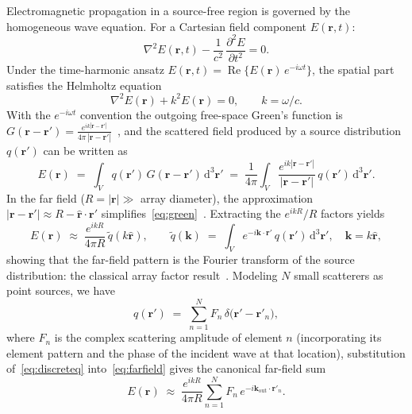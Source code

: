 \documentclass[11pt,letterpaper]{article}
\theoremstyle{definition}
\theoremstyle{plain}
\begin{document}
Electromagnetic propagation in a source-free region is governed by the homogeneous wave equation. For a Cartesian field component $E(\mathbf{r},t)$:
\[
\nabla^2 E(\mathbf{r},t) - \frac{1}{c^2}\,\frac{\partial^2 E}{\partial t^2} = 0.
\]
Under the time-harmonic ansatz $E(\mathbf{r},t) = \operatorname{Re}\{E(\mathbf{r})\,e^{-i\omega t}\}$, the spatial part satisfies the Helmholtz equation
\[
\nabla^2 E(\mathbf{r}) + k^2 E(\mathbf{r}) = 0, \qquad k = \omega/c.
\]
With the $e^{-i\omega t}$ convention the outgoing free-space Green's function is $G(\mathbf{r}-\mathbf{r}') = \frac{e^{ik|\mathbf{r}-\mathbf{r}'|}}{4\pi\,|\mathbf{r}-\mathbf{r}'|}$~\cite{Stratton1941,Jackson1999}, and the scattered field produced by a source distribution $q(\mathbf{r}')$ can be written as
\begin{equation}
E(\mathbf{r}) \;=\; \int_V q(\mathbf{r}')\,G(\mathbf{r}-\mathbf{r}')\,\mathrm{d}^3\mathbf{r}'
\;=\; \frac{1}{4\pi}\int_V \frac{e^{ik|\mathbf{r}-\mathbf{r}'|}}{|\mathbf{r}-\mathbf{r}'|}\,
q(\mathbf{r}')\,\mathrm{d}^3\mathbf{r}'.
\label{eq:green}
\end{equation}
In the far field ($R = |\mathbf{r}| \gg$ array diameter), the approximation $|\mathbf{r}-\mathbf{r}'| \approx R - \hat{\mathbf{r}}\cdot\mathbf{r}'$ simplifies~\eqref{eq:green}~\cite{Balanis2016,Mailloux2017_PhasedArrayBook}. Extracting the $e^{ikR}/R$ factors yields
\begin{equation}
E(\mathbf{r}) \;\approx\; \frac{e^{ikR}}{4\pi R}\,
\widetilde{q}\!\left(k\hat{\mathbf{r}}\right),
\qquad
\widetilde{q}(\mathbf{k}) \;=\; \int_V e^{-i\mathbf{k}\cdot\mathbf{r}'}\,q(\mathbf{r}')\,\mathrm{d}^3\mathbf{r}', \quad \mathbf{k} = k\hat{\mathbf{r}},
\label{eq:farfield}
\end{equation}
showing that the far-field pattern is the Fourier transform of the source distribution: the classical array factor result~\cite{Balanis2016,Mailloux2017_PhasedArrayBook}. Modeling $N$ small scatterers as point sources, we have
\begin{equation}
q(\mathbf{r}') \;=\; \sum_{n=1}^N F_n\,\delta\!\big(\mathbf{r}'-\mathbf{r}'_n\big),
\label{eq:discreteq}
\end{equation}
where $F_n$ is the complex scattering amplitude of element $n$ (incorporating its element pattern and the phase of the incident wave at that location), substitution of~\eqref{eq:discreteq} into~\eqref{eq:farfield} gives the canonical far-field sum
\begin{equation}
E(\mathbf{r}) \;\approx\; \frac{e^{ikR}}{4\pi R}
\sum_{n=1}^N F_n\, e^{-i\mathbf{k}_{\mathrm{out}}\cdot\mathbf{r}'_n}.
\label{eq:ff-sum}
\end{equation}
\end{document}
